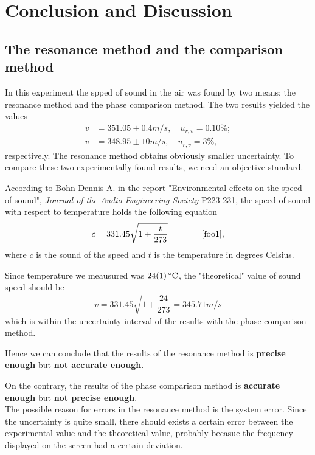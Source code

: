 \section{Conclusion and Discussion}
\subsection{The resonance method and the comparison method}
    In this experiment the spped of sound in the air was found by two means: the resonance method and the phase comparison method. The two results yielded the values
    \begin{equation}\label{res}
    \begin{split}
        v&=351.05\pm0.4 m/s,\quad u_{r,v}=0.10\%;\\
        v&=348.95\pm10 m/s,\quad u_{r,v}=3\%,
    \end{split}
    \end{equation}
    respectively. The resonance method obtains obviously smaller uncertainty. To compare these two experimentally found results, we need an objective standard.

    According to Bohn Dennis A. in the report "Environmental effects on the speed of sound", \emph{Journal of the Audio Engineering Society} P223-231, the speed of sound with respect to temperature holds the following equation
    \[
        c=331.45\sqrt{1+\frac{t}{273}}\quad\quad\quad\quad\cite{foo1},
    \]
    where $c$ is the sound of the speed and $t$ is the temperature in degrees Celsius.

    Since temperature we meausured was $\SI{24\pm1}{\degreeCelsius}$, the "theoretical" value of sound speed should be
    \[
        v=331.45\sqrt{1+\frac{24}{273}}=345.71m/s
    \]
    which is within the uncertainty interval of the results with the phase comparison method.

    Hence we can conclude that the results of the resonance method is \textbf{precise enough} but \textbf{not accurate enough}. 
    
    On the contrary, the results of the phase comparison method is \textbf{accurate enough} but \textbf{not precise enough}.\\

    The possible reason for errors in the resonance method is the system error. Since the uncertainty is quite small, there should exists a certain error between the experimental value and the theoretical value, probably becasue the frequency displayed on the screen had a certain deviation.


